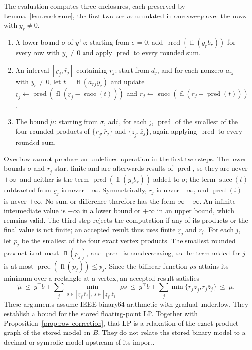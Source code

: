 The evaluation computes three enclosures, each preserved by
Lemma~\ref{lem:enclosure}; the first two are accumulated in one sweep over
the rows with $y_r\ne0$.
\begin{enumerate}
\item A lower bound $\sigma$ of $y^\top b$: starting from $\sigma=0$, add
$\operatorname{pred}(\operatorname{fl}(y_rb_r))$ for every row with
$y_r\ne0$ and apply $\operatorname{pred}$ to every rounded sum.
\item An interval $[\underline r_j,\overline r_j]$ containing $r_j$: start
from $d_j$, and for each nonzero $a_{rj}$ with $y_r\ne0$, let
$t=\operatorname{fl}(a_{rj}y_r)$ and update
$\underline r_j\leftarrow\operatorname{pred}(\operatorname{fl}(\underline r_j-\operatorname{succ}(t)))$
and
$\overline r_j\leftarrow\operatorname{succ}(\operatorname{fl}(\overline r_j-\operatorname{pred}(t)))$.
\item The bound $\tilde\mu$: starting from $\sigma$, add, for each $j$,
$\operatorname{pred}$ of the smallest of the four rounded products of
$\{\underline r_j,\overline r_j\}$ and $\{\underline z_j,\overline z_j\}$,
again applying $\operatorname{pred}$ to every rounded sum.
\end{enumerate}
Overflow cannot produce an undefined operation in the first two steps. The
lower bounds $\sigma$ and $\underline r_j$ start finite and are afterwards
results of $\operatorname{pred}$, so they are never $+\infty$, and neither
is the term $\operatorname{pred}(\operatorname{fl}(y_rb_r))$ added to
$\sigma$; the term $\operatorname{succ}(t)$ subtracted from $\underline r_j$
is never $-\infty$. Symmetrically, $\overline r_j$ is never $-\infty$, and
$\operatorname{pred}(t)$ is never $+\infty$. No sum or difference therefore
has the form $\infty-\infty$. An infinite intermediate
value is $-\infty$ in a lower bound or $+\infty$ in an upper bound, which
remains valid. The third step rejects the computation if any of its products
or the final value is not finite; an accepted result thus uses finite
$\underline r_j$ and $\overline r_j$. For each $j$, let $p_j$ be the smallest
of the four exact vertex products. The smallest rounded product is at most
$\operatorname{fl}(p_j)$, and $\operatorname{pred}$ is nondecreasing, so the
term added for $j$ is at most $\operatorname{pred}(\operatorname{fl}(p_j))\le p_j$.
Since the bilinear function $\rho s$ attains its minimum over a rectangle at
a vertex, an accepted result satisfies
\[
 \tilde\mu\ \le\ y^\top b+\sum_j
 \min_{\rho\in[\underline r_j,\overline r_j],\,s\in[\underline z_j,\overline z_j]}\rho s
 \ \le\ y^\top b+\sum_j\min\{r_j\underline z_j,r_j\overline z_j\}\ \le\ \mu .
\]
These arguments assume IEEE binary64 arithmetic with gradual underflow.
They establish a bound for the stored floating-point LP.
Together with Proposition~\ref{prop:row-correction}, that LP is a relaxation of
the exact product graph of the stored model on $B$. They do not relate the
stored binary model to a decimal or symbolic model upstream of its import.

